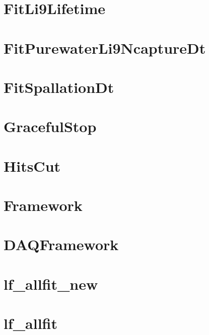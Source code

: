 \let\mypdfximage\pdfximage\def\pdfximage{\immediate\mypdfximage}\documentclass[twoside]{book}
\newcommand{\+}{\discretionary{\mbox{\scriptsize$\hookleftarrow$}}{}{}}
\begin{document}
\chapter{Fit\+Li9\+Lifetime}
\label{md_UserTools_FitLi9Lifetime_README}

\chapter{Fit\+Purewater\+Li9\+Ncapture\+Dt}
\label{md_UserTools_FitPurewaterLi9NcaptureDt_README}

\chapter{Fit\+Spallation\+Dt}
\label{md_UserTools_FitSpallationDt_README}

\chapter{Graceful\+Stop}
\label{md_UserTools_GracefulStop_README}

\chapter{Hits\+Cut}
\label{md_UserTools_IDHitsCut_README}

\chapter{Framework}
\label{md_UserTools_ImportedTools_README}

\chapter{DAQFramework}
\label{md_UserTools_InactiveTools_README}

\chapter{lf\+\_\+allfit\+\_\+new}
\label{md_UserTools_lfallfit_README}

\chapter{lf\+\_\+allfit}
\label{md_UserTools_lfallfit_simple_README}

\end{document}

